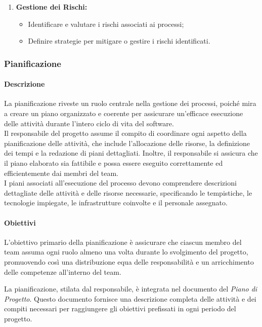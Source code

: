 \begin{enumerate}
    \item \textbf{Gestione dei Rischi:}
      \begin{itemize}
        \item Identificare e valutare i rischi associati ai processi;
        \item Definire strategie per mitigare o gestire i rischi identificati.
      \end{itemize}
  \end{enumerate}
  
\subsubsection{Pianificazione}

\paragraph{Descrizione}
La pianificazione riveste un ruolo centrale nella gestione dei processi, poiché mira a creare un piano organizzato e coerente per assicurare un'efficace esecuzione delle attività durante l'intero ciclo di vita del software. \\
Il responsabile del progetto assume il compito di coordinare ogni aspetto della pianificazione delle attività, che include l'allocazione delle risorse, la definizione dei tempi e la redazione di piani dettagliati. Inoltre, il responsabile si assicura che il piano elaborato sia fattibile e possa essere eseguito correttamente ed efficientemente dai membri del team. \\
I piani associati all'esecuzione del processo devono comprendere descrizioni dettagliate delle attività e delle risorse necessarie, specificando le tempistiche, le tecnologie impiegate, le infrastrutture coinvolte e il personale assegnato.

\paragraph{Obiettivi}

L'obiettivo primario della pianificazione è assicurare che ciascun membro del team assuma ogni ruolo almeno una volta durante lo svolgimento del progetto, promuovendo così una distribuzione equa delle responsabilità e un arricchimento delle competenze all'interno del team.

\vspace{0,1cm}

La pianificazione, stilata dal responsabile, è integrata nel documento del \textit{Piano di Progetto}. Questo documento fornisce una descrizione completa delle attività e dei compiti necessari per raggiungere gli obiettivi prefissati in ogni periodo del progetto.
